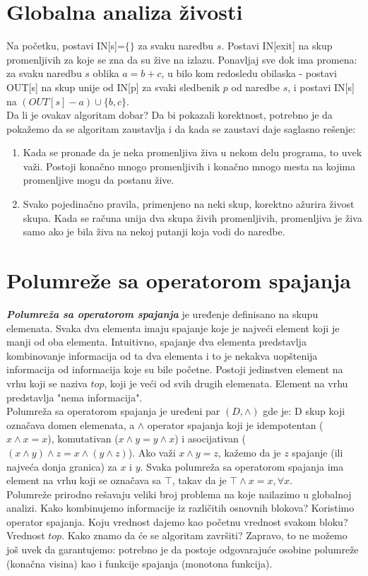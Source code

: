 \documentclass[10pt]{extarticle}
\begin{document}
\section{Globalna analiza živosti}
\noindent
Na početku, postavi IN[s]=$\{\}$ za svaku naredbu $s$. Postavi IN[exit] na skup promenljivih za koje se zna da su žive na izlazu. Ponavljaj sve dok ima promena: za svaku naredbu $s$ oblika $a=b+c$, u bilo kom redosledu obilaska - postavi OUT[s] na skup unije od IN[p] za svaki sledbenik $p$ od naredbe $s$, i postavi IN[s] na $(OUT[s]-a)\cup \{b,c\}$.\\
Da li je ovakav algoritam dobar? Da bi pokazali korektnost, potrebno je da pokažemo da se algoritam zaustavlja i da kada se zaustavi daje saglasno rešenje:
\begin{enumerate}
    \item Kada se pronađe da je neka promenljiva živa u nekom delu programa, to uvek važi. Postoji konačno mnogo promenljivih i konačno mnogo mesta na kojima promenljive mogu da postanu žive.
    \item Svako pojedinačno pravila, primenjeno na neki skup, korektno ažurira živost skupa. Kada se računa unija dva skupa živih promenljivih, promenljiva je živa samo ako je bila živa na nekoj putanji koja vodi do naredbe.
\end{enumerate}

\section{Polumreže sa operatorom spajanja}
\noindent
\textit{\textbf{Polumreža sa operatorom spajanja}} je uređenje definisano na skupu elemenata. Svaka dva elementa imaju spajanje koje je najveći element koji je manji od oba elementa. Intuitivno, spajanje dva elementa predstavlja kombinovanje informacija od ta dva elementa i to je nekakva uopštenija informacija od informacija koje su bile početne. Postoji jedinstven element na vrhu koji se naziva $top$, koji je veći od svih drugih elemenata. Element na vrhu predstavlja "nema informacija".\\
Polumreža sa operatorom spajanja je uređeni par $(D, \wedge)$ gde je: D skup koji označava domen elemenata, a $\wedge$ operator spajanja koji je idempotentan ($x \wedge x = x$), komutativan ($x \wedge y = y \wedge x$) i asocijativan 
($(x \wedge y) \wedge z = x \wedge (y \wedge z)$). Ako važi $x \wedge y = z$, kažemo da je $z$ spajanje (ili najveća donja granica) za $x$ i $y$. Svaka polumreža sa operatorom spajanja ima element na vrhu koji se označava sa $\top$, takav da je $\top \wedge x = x, \forall x$. \\
Polumreže prirodno rešavaju veliki broj problema na koje nailazimo u globalnoj analizi. Kako kombinujemo informacije iz različitih osnovnih blokova? Koristimo operator spajanja. Koju vrednost dajemo kao početnu vrednost svakom bloku? Vrednost $top$. Kako znamo da će se algoritam završiti? Zapravo, to ne možemo još uvek da garantujemo: potrebno je da postoje odgovarajuće osobine polumreže (konačna visina) kao i funkcije spajanja (monotona funkcija).
\end{document}
